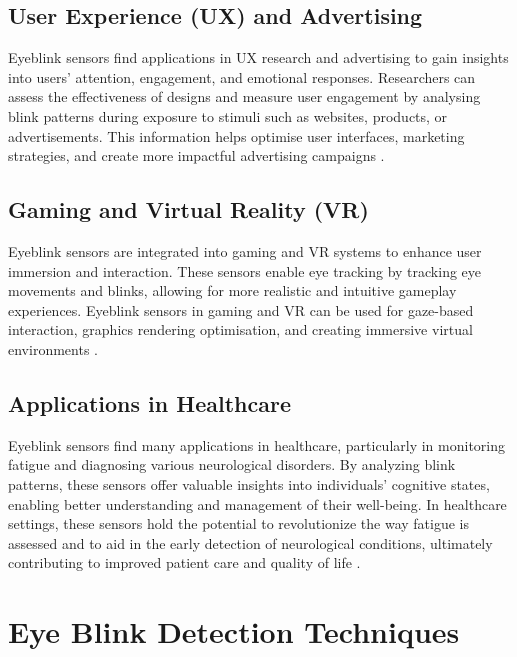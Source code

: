 \documentclass[conference]{IEEEtran}
\begin{document}
\subsection{User Experience (UX) and Advertising}
Eyeblink sensors find applications in UX research and advertising to gain insights into users' attention, engagement, and emotional responses. Researchers can assess the effectiveness of designs and measure user engagement by analysing blink patterns during exposure to stimuli such as websites, products, or advertisements. This information helps optimise user interfaces, marketing strategies, and create more impactful advertising campaigns \cite {iot} \cite{blink patterns}.

\subsection{Gaming and Virtual Reality (VR)}
Eyeblink sensors are integrated into gaming and VR systems to enhance user immersion and interaction. These sensors enable eye tracking by tracking eye movements and blinks, allowing for more realistic and intuitive gameplay experiences. Eyeblink sensors in gaming and VR can be used for gaze-based interaction, graphics rendering optimisation, and creating immersive virtual environments \cite{gaming and VR}.

\subsection{Applications in Healthcare}
Eyeblink sensors find many applications in healthcare, particularly in monitoring fatigue and diagnosing various neurological disorders. By analyzing blink patterns, these sensors offer valuable insights into individuals' cognitive states, enabling better understanding and management of their well-being. In healthcare settings, these sensors hold the potential to revolutionize the way fatigue is assessed and to aid in the early detection of neurological conditions, ultimately contributing to improved patient care and quality of life \cite{Nih}.


\section{Eye Blink Detection Techniques}
\end{document}
